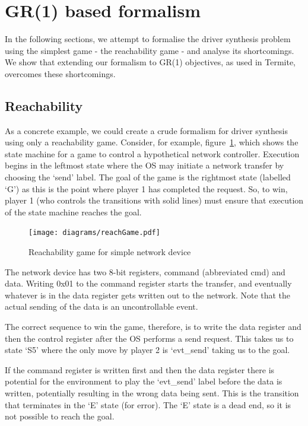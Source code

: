 \section{GR(1) based formalism}

In the following sections, we attempt to formalise the driver synthesis problem using the simplest game - the reachability game - and analyse its shortcomings. We show that extending our formalism to GR(1) objectives, as used in Termite, overcomes these shortcomings.

\subsection{Reachability}

As a concrete example, we could create a crude formalism for driver synthesis using only a reachability game. Consider, for example, figure~\ref{fig:reach}, which shows the state machine for a game to control a hypothetical network controller. Execution begins in the leftmost state where the OS may initiate a network transfer by choosing the `send' label. The goal of the game is the rightmost state (labelled `G') as this is the point where player 1 has completed the request. So, to win, player 1 (who controls the transitions with solid lines) must ensure that execution of the state machine reaches the goal. 

\begin{figure}
\centering
\texttt{[image: diagrams/reachGame.pdf]}
\caption{Reachability game for simple network device}
\label{fig:reach}
\end{figure}

The network device has two 8-bit registers, command (abbreviated cmd) and data. Writing 0x01 to the command register starts the transfer, and eventually whatever is in the data register gets written out to the network. Note that the actual sending of the data is an uncontrollable event. 

The correct sequence to win the game, therefore, is to write the data register and then the control register after the OS performs a send request. This takes us to state `S5' where the only move by player 2 is `evt\_send' taking us to the goal. 

If the command register is written first and then the data register there is potential for the environment to play the `evt\_send' label before the data is written, potentially resulting in the wrong data being sent. This is the transition that terminates in the `E' state (for error). The `E' state is a dead end, so it is not possible to reach the goal. 


